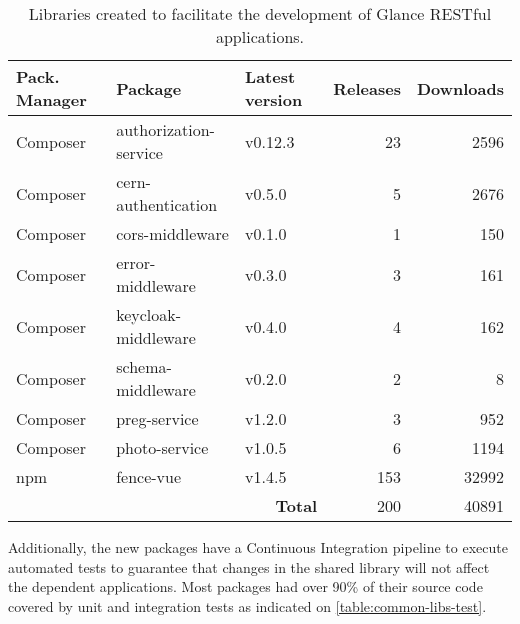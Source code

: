 \begin{table}[htbp]
\begin{tabular}{ll|l|r|r|}
\hline
\multicolumn{1}{|l|}{Pack. Manager} & Package & Latest version & \multicolumn{1}{l|}{Releases} & \multicolumn{1}{l|}{Downloads} \\ \hline
\multicolumn{1}{|l|}{Composer} & authorization-service & v0.12.3 & 23  & 2596  \\
\multicolumn{1}{|l|}{Composer} & cern-authentication   & v0.5.0  & 5   & 2676  \\
\multicolumn{1}{|l|}{Composer} & cors-middleware       & v0.1.0  & 1   & 150   \\
\multicolumn{1}{|l|}{Composer} & error-middleware      & v0.3.0  & 3   & 161   \\
\multicolumn{1}{|l|}{Composer} & keycloak-middleware   & v0.4.0  & 4   & 162   \\
\multicolumn{1}{|l|}{Composer} & schema-middleware     & v0.2.0  & 2   & 8     \\
\multicolumn{1}{|l|}{Composer} & preg-service          & v1.2.0  & 3   & 952   \\
\multicolumn{1}{|l|}{Composer} & photo-service         & v1.0.5  & 6   & 1194  \\
\multicolumn{1}{|l|}{\acrshort{npm}}      & fence-vue             & v1.4.5  & 153 & 32992 \\
\hline
         & & \multicolumn{1}{r|}{\textbf{Total}} & 200 & 40891 \\
\cline{3-5}
\end{tabular}
\caption{Libraries created to facilitate the development of Glance RESTful applications.}
\label{table:common-libs}
\end{table}

Additionally, the new packages have a Continuous Integration pipeline to execute automated tests to guarantee that changes in the shared library will not affect the dependent applications. Most packages had over 90\% of their source code covered by unit and integration tests as indicated on \autoref{table:common-libs-test}.

